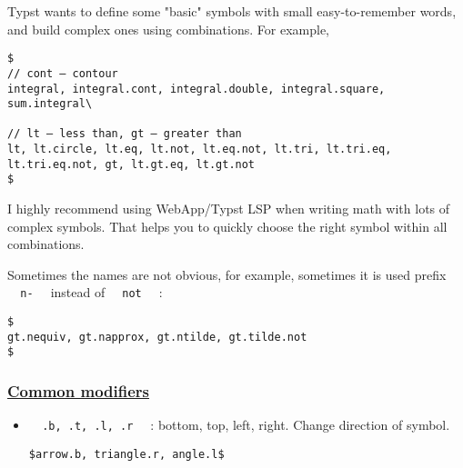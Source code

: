 Typst wants to define some "basic" symbols with small easy-to-remember
words, and build complex ones using combinations. For example,

\begin{verbatim}
$
// cont — contour
integral, integral.cont, integral.double, integral.square, sum.integral\

// lt — less than, gt — greater than
lt, lt.circle, lt.eq, lt.not, lt.eq.not, lt.tri, lt.tri.eq, lt.tri.eq.not, gt, lt.gt.eq, lt.gt.not
$
\end{verbatim}

\pandocbounded{}

I highly recommend using WebApp/Typst LSP when writing math with lots of
complex symbols. That helps you to quickly choose the right symbol
within all combinations.

Sometimes the names are not obvious, for example, sometimes it is used
prefix \texttt{\ }{\texttt{\ n-\ }}\texttt{\ } instead of
\texttt{\ }{\texttt{\ not\ }}\texttt{\ } :

\begin{verbatim}
$
gt.nequiv, gt.napprox, gt.ntilde, gt.tilde.not
$
\end{verbatim}

\pandocbounded{}

\subsubsection{\texorpdfstring{\hyperref[common-modifiers]{Common
modifiers}}{Common modifiers}}\label{common-modifiers}

\begin{itemize}
\item
  \texttt{\ }{\texttt{\ .b,\ .t,\ .l,\ .r\ }}\texttt{\ } : bottom, top,
  left, right. Change direction of symbol.

\begin{verbatim}
$arrow.b, triangle.r, angle.l$
\end{verbatim}

  \pandocbounded{}
\end{itemize}
